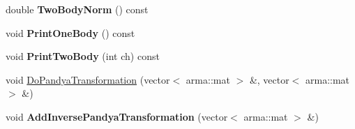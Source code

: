 \begin{DoxyCompactItemize}
\item 
\hypertarget{classOperator_af1c40bdef64ec9abd5d95e8328565a67}{double {\bfseries Two\-Body\-Norm} () const }\label{classOperator_af1c40bdef64ec9abd5d95e8328565a67}

\item 
\hypertarget{classOperator_a5ec5a8110337108ac31d3af7337e454b}{void {\bfseries Print\-One\-Body} () const }\label{classOperator_a5ec5a8110337108ac31d3af7337e454b}

\item 
\hypertarget{classOperator_a905e42cefafaca0eb155cf41b3cd37b8}{void {\bfseries Print\-Two\-Body} (int ch) const }\label{classOperator_a905e42cefafaca0eb155cf41b3cd37b8}

\item 
void \hyperlink{classOperator_ad468922e03d15318c23886e6bfecc168}{Do\-Pandya\-Transformation} (vector$<$ arma\-::mat $>$ \&, vector$<$ arma\-::mat $>$ \&)
\item 
\hypertarget{classOperator_a52dbcde640637889ab6a1dd90e1ceb62}{void {\bfseries Add\-Inverse\-Pandya\-Transformation} (vector$<$ arma\-::mat $>$ \&)}\label{classOperator_a52dbcde640637889ab6a1dd90e1ceb62}


\end{DoxyCompactItemize}
